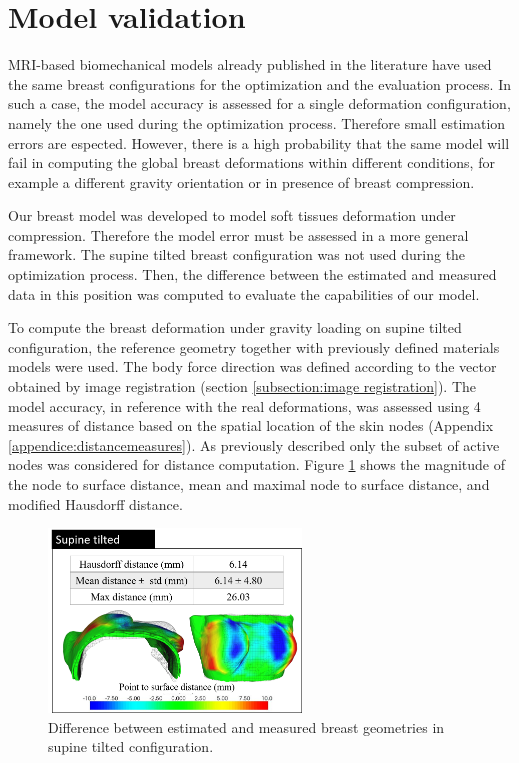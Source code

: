 \section{Model validation}\label{chapter:modelvalidation}

MRI-based biomechanical models already published in the literature have used the same breast configurations for the optimization and the evaluation process. In such a case, the model accuracy is assessed for a single deformation configuration, namely the one used during the optimization process. Therefore small estimation errors are espected. However, there is a high probability that the same model will fail in computing the global breast deformations within different conditions, for example a different gravity orientation or in presence of breast compression. 

Our breast model was developed to model soft tissues deformation under compression. Therefore the model error must be assessed in a more general framework. The supine tilted breast configuration was not used during the optimization process. Then, the difference between the estimated and measured data in this position was computed to evaluate the capabilities of our model. 

To compute the breast deformation under gravity loading on supine tilted configuration, the reference geometry together with previously defined materials models were used. The body force direction was defined according to the vector obtained by image registration (section \ref{subsection:image registration}). The model accuracy, in reference with the real deformations, was assessed using 4 measures of distance based on the spatial location of the skin nodes (Appendix \ref{appendice:distancemeasures}). As previously described only the subset of active nodes was considered for distance computation. Figure \ref{fig:modelevaluation} shows the magnitude of the node to surface distance, mean and maximal node to surface distance, and modified Hausdorff distance.
 
\begin{figure}[!h]
\centering
\includegraphics[width=0.6\textwidth,keepaspectratio]{figures/modelevaluation.png} 
\caption{Difference between estimated and measured breast geometries in supine tilted configuration.}\label{fig:modelevaluation}
\end{figure}

